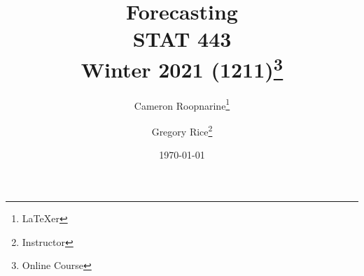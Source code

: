 


\usepackage{minted}

\title{%
\LARGE Forecasting\\%
\large STAT 443\\%
\normalsize Winter 2021 (1211)\thanks{Online Course}}%
\author{Cameron Roopnarine\thanks{\LaTeX{}er}\and Gregory Rice\thanks{Instructor}}%
\date{\today}%



\maketitle

\tableofcontents















